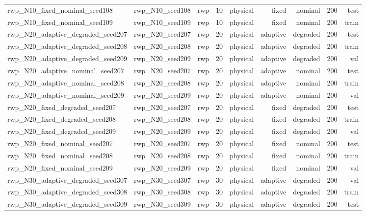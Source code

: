 \begin{tabular}{lrrrrrrrr}
rwp\_N10\_fixed\_nominal\_seed108 & rwp\_N10\_seed108 & rwp & 10 & physical & fixed & nominal & 200 & test \\
rwp\_N10\_fixed\_nominal\_seed109 & rwp\_N10\_seed109 & rwp & 10 & physical & fixed & nominal & 200 & train \\
rwp\_N20\_adaptive\_degraded\_seed207 & rwp\_N20\_seed207 & rwp & 20 & physical & adaptive & degraded & 200 & test \\
rwp\_N20\_adaptive\_degraded\_seed208 & rwp\_N20\_seed208 & rwp & 20 & physical & adaptive & degraded & 200 & train \\
rwp\_N20\_adaptive\_degraded\_seed209 & rwp\_N20\_seed209 & rwp & 20 & physical & adaptive & degraded & 200 & val \\
rwp\_N20\_adaptive\_nominal\_seed207 & rwp\_N20\_seed207 & rwp & 20 & physical & adaptive & nominal & 200 & test \\
rwp\_N20\_adaptive\_nominal\_seed208 & rwp\_N20\_seed208 & rwp & 20 & physical & adaptive & nominal & 200 & train \\
rwp\_N20\_adaptive\_nominal\_seed209 & rwp\_N20\_seed209 & rwp & 20 & physical & adaptive & nominal & 200 & val \\
rwp\_N20\_fixed\_degraded\_seed207 & rwp\_N20\_seed207 & rwp & 20 & physical & fixed & degraded & 200 & test \\
rwp\_N20\_fixed\_degraded\_seed208 & rwp\_N20\_seed208 & rwp & 20 & physical & fixed & degraded & 200 & train \\
rwp\_N20\_fixed\_degraded\_seed209 & rwp\_N20\_seed209 & rwp & 20 & physical & fixed & degraded & 200 & val \\
rwp\_N20\_fixed\_nominal\_seed207 & rwp\_N20\_seed207 & rwp & 20 & physical & fixed & nominal & 200 & test \\
rwp\_N20\_fixed\_nominal\_seed208 & rwp\_N20\_seed208 & rwp & 20 & physical & fixed & nominal & 200 & train \\
rwp\_N20\_fixed\_nominal\_seed209 & rwp\_N20\_seed209 & rwp & 20 & physical & fixed & nominal & 200 & val \\
rwp\_N30\_adaptive\_degraded\_seed307 & rwp\_N30\_seed307 & rwp & 30 & physical & adaptive & degraded & 200 & val \\
rwp\_N30\_adaptive\_degraded\_seed308 & rwp\_N30\_seed308 & rwp & 30 & physical & adaptive & degraded & 200 & train \\
rwp\_N30\_adaptive\_degraded\_seed309 & rwp\_N30\_seed309 & rwp & 30 & physical & adaptive & degraded & 200 & test \\

\end{tabular}
